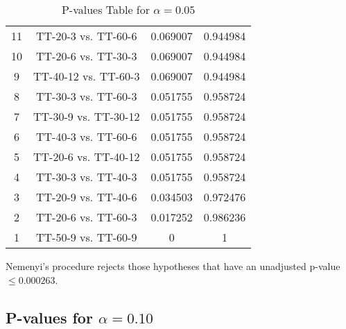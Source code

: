 \documentclass[a4paper,10pt]{article}
\begin{document}
\begin{landscape}
\begin{table}[!htp]
\begin{tabular}{cccc}
11&TT-20-3 vs. TT-60-6&0.069007&0.944984\\
10&TT-20-6 vs. TT-30-3&0.069007&0.944984\\
9&TT-40-12 vs. TT-60-3&0.069007&0.944984\\
8&TT-30-3 vs. TT-60-3&0.051755&0.958724\\
7&TT-30-9 vs. TT-30-12&0.051755&0.958724\\
6&TT-40-3 vs. TT-60-6&0.051755&0.958724\\
5&TT-20-6 vs. TT-40-12&0.051755&0.958724\\
4&TT-30-3 vs. TT-40-3&0.051755&0.958724\\
3&TT-20-9 vs. TT-40-6&0.034503&0.972476\\
2&TT-20-6 vs. TT-60-3&0.017252&0.986236\\
1&TT-50-9 vs. TT-60-9&0&1\\
\hline
\end{tabular}
\caption{P-values Table for $\alpha=0.05$}
\end{table}Nemenyi's procedure rejects those hypotheses that have an unadjusted p-value $\le0.000263$.

\pagebreak

\subsection{P-values for $\alpha=0.10$}


\end{landscape}
\end{document}
